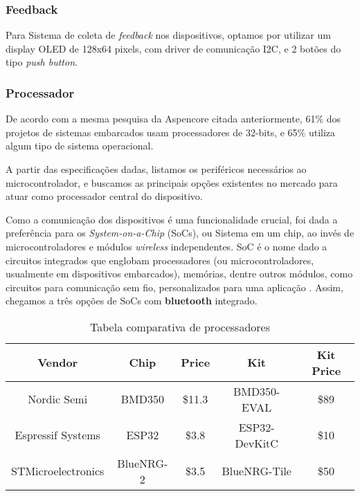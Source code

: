 \documentclass[../monografia.tex]{subfiles}
\begin{document}
\subsubsection{Feedback}

Para Sistema de coleta de \textit{feedback} nos dispositivos, optamos por utilizar um display OLED\cite{oled} de 128x64 pixels, com driver de comunicação I2C, e 2 botões do tipo \textit{push button}. 

\subsubsection{Processador}

De acordo com a mesma pesquisa da Aspencore citada anteriormente, 61\% dos projetos de sistemas embarcados usam processadores de 32-bits, e 65\% utiliza algum tipo de sistema operacional. 

A partir das especificações dadas, listamos os periféricos necessários ao microcontrolador, e buscamos as principais opções existentes no mercado para atuar como processador central do dispositivo. 

Como a comunicação dos dispositivos é uma funcionalidade crucial, foi dada a preferência para os \textit{System-on-a-Chip} (SoCs), ou Sistema em um chip, ao invés de microcontroladores e módulos \textit{wireless} independentes. SoC é o nome dado a circuitos integrados que englobam processadores (ou microcontroladores, usualmente em dispositivos embarcados), memórias, dentre outros módulos, como circuitos para comunicação sem fio, personalizados para uma aplicação \cite{soc}. Assim, chegamos a três opções de SoCs com \textbf{bluetooth} integrado. 


\begin{center}
\begin{table}
\begin{tabular}{|c|c|c|c|c|} 
\hline
\textbf{Vendor} & \textbf{Chip} & \textbf{Price} & \textbf{Kit} & \textbf{Kit Price} \\
\hline
Nordic Semi & BMD350 & \$11.3 & BMD350-EVAL & \$89 \\ 
Espressif Systems & ESP32 & \$3.8 & ESP32-DevKitC & \$10 \\ 
STMicroelectronics & BlueNRG-2 & \$3.5 & BlueNRG-Tile & \$50 \\ 
\hline
\end{tabular}
\caption{Tabela comparativa de processadores}
\label{table}
\end{table}
\end{center}
\end{document}
